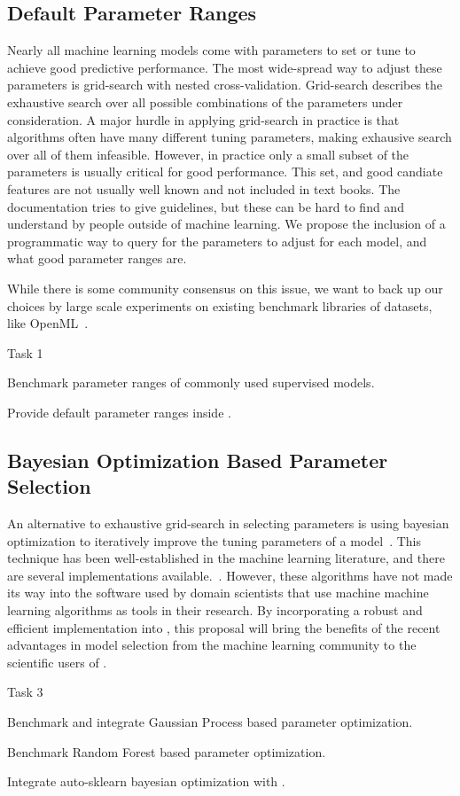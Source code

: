 \subsection{Default Parameter Ranges}
Nearly all machine learning models come with parameters to set or tune
to achieve good predictive performance. The most wide-spread way to adjust
these parameters is grid-search with nested cross-validation.
Grid-search describes the exhaustive search over all possible combinations
of the parameters under consideration.
A major hurdle in applying grid-search in practice is that algorithms
often have many different tuning parameters, making exhausive search
over all of them infeasible. However, in practice only a small subset
of the parameters is usually critical for good performance. This set,
and good candiate features are not usually well known and not included in text books.
The \sklearn{} documentation tries to give guidelines, but these can be hard
to find and understand by people outside of machine learning.
We propose the inclusion of a programmatic way to query for the parameters
to adjust for each model, and what good parameter ranges are.

While there is some community consensus on this issue, we want to back
up our choices by large scale experiments on existing benchmark libraries
of datasets, like OpenML~\autocite{van2013openml}.
\begin{labeling}{Task 1}
    \item [Task 1] Benchmark parameter ranges of commonly used supervised models.
    \item [Task 2] Provide default parameter ranges inside \sklearn{}.
\end{labeling}

\subsection{Bayesian Optimization Based Parameter Selection}
An alternative to exhaustive grid-search in selecting parameters is using
bayesian optimization to iteratively improve the tuning parameters of a model~\autocite{NIPS2011_4443, shahriari2016taking, NIPS2012_4522}.
This technique has been well-established in the machine learning literature,
and there are several implementations available.~\autocite{bergstra2013hyperopt, feurer-nips2015, komer2014hyperopt, snoek2015scalable}.
However, these algorithms have not made its way into the software used by
domain scientists that use machine machine learning algorithms as tools in
their research.
By incorporating a robust and efficient implementation into \sklearn{},
this proposal will bring the benefits of the recent advantages in model selection
from the machine learning community to the scientific users of \sklearn{}.
\begin{labeling}{Task 3}
    \item [Task 3] Benchmark and integrate Gaussian Process based parameter optimization.
    \item [Task 4] Benchmark Random Forest based parameter optimization.
    \item [Task 5] Integrate auto-sklearn bayesian optimization with \sklearn{}.
\end{labeling}

